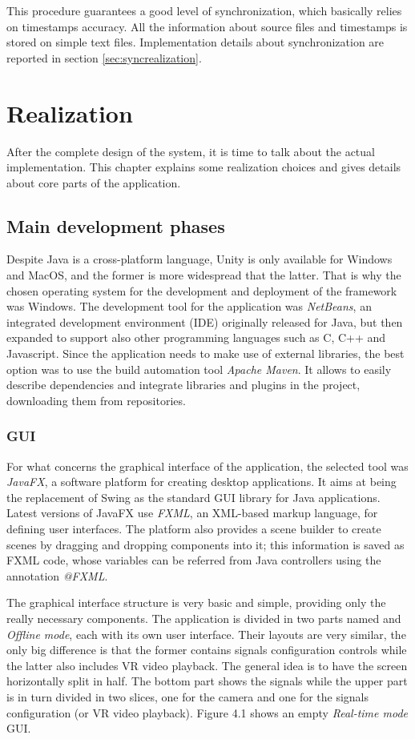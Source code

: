 \documentclass[binding=0.6cm,LaM]{sapthesis}
\begin{document}
This procedure guarantees a good level of synchronization, which basically relies on timestamps accuracy. All the information about source files and timestamps is stored on simple text files. Implementation details about synchronization are reported in section \ref{sec:syncrealization}.


\chapter{Realization}
After the complete design of the system, it is time to talk about the actual implementation. This chapter explains some realization choices and gives details about core parts of the application.

\section{Main development phases}
Despite Java is a cross-platform language, Unity is only available for Windows and MacOS, and the former is more widespread that the latter. That is why the chosen operating system for the development and deployment of the framework was Windows. 
The development tool for the application was \textit{NetBeans}, an integrated development environment (IDE) originally released for Java, but then expanded to support also other programming languages such as C, C++ and Javascript.
Since the application needs to make use of external libraries, the best option was to use the build automation tool \textit{Apache Maven}.
It allows to easily describe dependencies and integrate libraries and plugins in the project, downloading them from repositories. 

\subsection{GUI}
For what concerns the graphical interface of the application, the selected tool was \textit{JavaFX}, a software platform for creating desktop applications. It aims at being the replacement of Swing as the standard GUI library for Java applications. Latest versions of JavaFX use \textit{FXML}, an XML-based markup language, for defining user interfaces. The platform also provides a scene builder to create scenes by dragging and dropping components into it; this information is saved as FXML code, whose variables can be referred from Java controllers using the annotation \textit{@FXML}. 

The graphical interface structure is very basic and simple, providing only the really necessary components. The application is divided in two parts named  and \textit{Offline mode}, each with its own user interface. Their layouts are very similar, the only big difference is that the former contains signals configuration controls while the latter also includes VR video playback.
The general idea is to have the screen horizontally split in half. The bottom part shows the signals while the upper part is in turn divided in two slices, one for the camera and one for the signals configuration (or VR video playback). Figure 4.1 shows an empty \textit{Real-time mode} GUI. 
\end{document}
